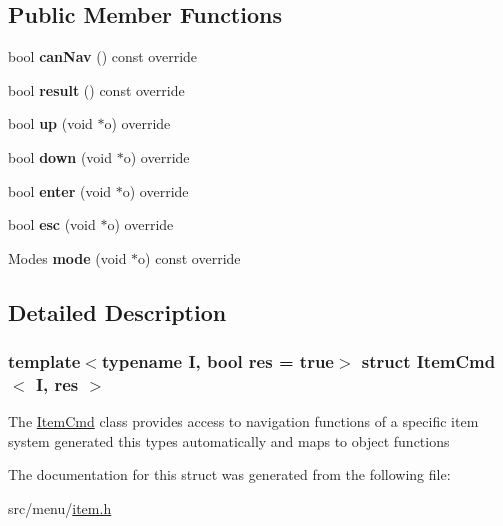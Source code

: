\subsection*{Public Member Functions}
\begin{DoxyCompactItemize}
\item 
\mbox{\label{structItemCmd_a557f384fe3a5fd259fb780cd625f5999}} 
bool {\bfseries can\+Nav} () const override
\item 
\mbox{\label{structItemCmd_ad3265b47195a0ef366cceaf9a49006bb}} 
bool {\bfseries result} () const override
\item 
\mbox{\label{structItemCmd_a4fdc8aa98593990b0624f23ead5406d5}} 
bool {\bfseries up} (void $\ast$o) override
\item 
\mbox{\label{structItemCmd_ac0f94b985d35d18bf876f13bc99b5227}} 
bool {\bfseries down} (void $\ast$o) override
\item 
\mbox{\label{structItemCmd_a1fbdc11692ef58433eebfa12b4f102d0}} 
bool {\bfseries enter} (void $\ast$o) override
\item 
\mbox{\label{structItemCmd_a350f85aeabb638c42390f81ffe4a52d6}} 
bool {\bfseries esc} (void $\ast$o) override
\item 
\mbox{\label{structItemCmd_a4545584d71b8fece09fe21313c3562c0}} 
Modes {\bfseries mode} (void $\ast$o) const override
\end{DoxyCompactItemize}


\subsection{Detailed Description}
\subsubsection*{template$<$typename I, bool res = true$>$\newline
struct Item\+Cmd$<$ I, res $>$}

The \hyperlink{structItemCmd}{Item\+Cmd} class provides access to navigation functions of a specific item system generated this types automatically and maps to object functions 

The documentation for this struct was generated from the following file\+:\begin{DoxyCompactItemize}
\item 
src/menu/\hyperlink{item_8h}{item.\+h}\end{DoxyCompactItemize}

